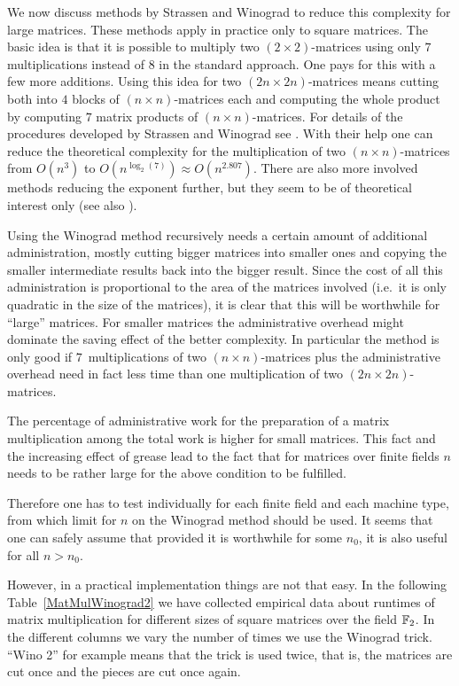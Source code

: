 We now discuss methods by Strassen and Winograd to reduce this complexity
%
for large matrices. These methods apply in practice only to square matrices.
The basic idea is that it is possible to multiply two $(2 \times 2)$-matrices
using only $7$ multiplications instead of $8$ in the standard approach.
One pays for this with a few more additions. Using this idea for two 
$(2n \times 2n)$-matrices means cutting both into $4$ blocks of 
$(n\times n)$-matrices each and computing the whole product by computing
$7$ matrix products of $(n \times n)$-matrices. For details of the
procedures developed by Strassen and Winograd see \cite[4.6.4]{AOCP2}.
%
With their help one can reduce the theoretical complexity for the 
multiplication of two $(n \times n)$-matrices from $O(n^3)$
to $O(n^{\log_2(7)}) \approx O(n^{2.807})$. 
There are also more involved methods reducing the exponent
further, but they seem to be of theoretical interest only (see 
also \cite[4.6.4]{AOCP2}).

Using the Winograd method recursively needs a certain amount of
%
additional administration, mostly cutting bigger matrices into smaller
ones and copying the smaller intermediate results back into the
bigger result. Since the cost of all this administration is proportional
to the area of the matrices involved (i.e.~it is only quadratic in the
size of the matrices), it is clear that this will be worthwhile for 
``large'' matrices. For smaller matrices the administrative overhead
might dominate the saving effect of the better complexity.
In particular the method is only good if $7$~multiplications of two $(n
\times n)$-matrices plus the administrative overhead need in fact less
time than one multiplication of two $(2n \times 2n)$-matrices.

The percentage of administrative work for the preparation of a matrix
multiplication among the total work is higher for small matrices.
This fact and the increasing effect of grease lead to the
fact that for matrices over finite fields $n$ needs to be rather large
for the above condition to be fulfilled. 

Therefore one has to test individually for each finite field and each
machine type, from which limit for $n$ on the Winograd method should
be used. It seems that one can safely assume that provided it is 
worthwhile for some $n_0$, it is also useful for all $n > n_0$. 

However, in a practical implementation things are not that easy. In
the following Table~\ref{MatMulWinograd2} we have collected empirical
data about runtimes of matrix multiplication for different sizes of
square matrices over the field $\mathbb{F}_2$. In the different columns we vary
the number of times we use the Winograd trick. ``Wino 2'' for example
means that the trick is used twice, that is, the matrices are cut once
and the pieces are cut once again.

